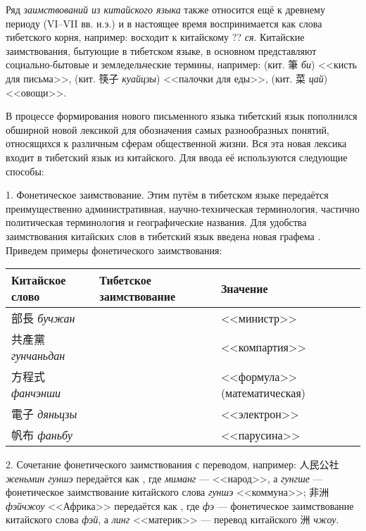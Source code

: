 Ряд \emph{заимствований из китайского языка} также относится ещё к древнему периоду (VI--VII вв. н.э.) и в настоящее время воспринимается как слова тибетского корня, например:  восходит к китайскому {\chinfont ??} \textit{ся}. Китайские заимствования, бытующие в тибетском языке, в основном представляют социально-бытовые и земледельческие термины, например:  (кит. {\chinfont 筆} \textit{би}) <<кисть для письма>>,  (кит. {\chinfont 筷子} \textit{куайцзы}) <<палочки для еды>>,  (кит. {\chinfont 菜} \textit{цай}) <<овощи>>.

В процессе формирования нового письменного языка тибетский язык пополнился обширной новой лексикой для обозначения самых разнообразных понятий, относящихся к различным сферам общественной жизни. Вся эта новая лексика входит в тибетский язык из китайского. Для ввода её используются следующие способы:

1. Фонетическое заимствование. Этим путём в тибетском языке передаётся преимущественно административная, научно-техническая терминология, частично политическая терминология и географические названия. Для удобства заимствования китайских слов в тибетский язык введена новая графема . Приведем примеры фонетического заимствования:

\begin{tabularx}{\textwidth}{*{3}{p{}}}
	\toprule
	\parbox[m]{0.3\textwidth}{\small Китайское слово} & \parbox[m]{0.3\textwidth}{\small Тибетское заимствование} & \parbox[m]{0.3\textwidth}{\small Значение}\\
	\midrule
	{\chinfont 部長} \textit{бучжан} &  & <<министр>>\\
	{\chinfont 共產黨} \textit{гунчаньдан} &  & <<компартия>>\\
	{\chinfont 方程式} \textit{фанчэнши} &  & <<формула>> (математическая)\\
	{\chinfont 電子} \textit{дяньцзы} &  & <<электрон>>\\
	{\chinfont 帆布} \textit{фаньбу} &  & <<парусина>>\\
	\bottomrule
\end{tabularx}

2. Сочетание фонетического заимствования с переводом, например: {\chinfont 人民公社} \textit{женьмин гуншэ} передаётся как , где \textit{миманг} --- <<народ>>, а \textit{гунгше} --- фонетическое заимствование китайского слова \textit{гуншэ} <<коммуна>>; {\chinfont 非洲} \textit{фэйчжоу} <<Африка>> передаётся как , где \textit{фэ} --- фонетическое заимствование китайского слова \textit{фэй}, а \textit{линг} <<материк>> --- перевод китайского {\chinfont 洲} \textit{чжоу}.

